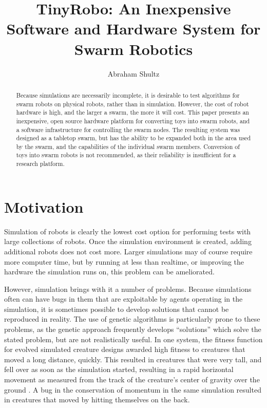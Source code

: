 \documentclass[]{article}
\title{TinyRobo: An Inexpensive Software and Hardware System for Swarm Robotics}
\author{Abraham Shultz}
\begin{document}
\maketitle

\begin{abstract}
Because simulations are necessarily incomplete, it is desirable to test algorithms for swarm robots on physical robots, rather than in simulation. 
However, the cost of robot hardware is high, and the larger a swarm, the more it will cost. 
This paper presents an inexpensive, open source hardware platform for converting toys into swarm robots, and a software infrastructure for controlling the swarm nodes. 
The resulting system was designed as a tabletop swarm, but has the ability to be expanded both in the area used by the swarm, and the capabilities of the individual swarm members. 
Conversion of toys into swarm robots is not recommended, as their reliability is insufficient for a research platform.

\end{abstract}

\section{Motivation}

Simulation of robots is clearly the lowest cost option for performing tests with large collections of robots. 
Once the simulation environment is created, adding additional robots does not cost more. 
Larger simulations may of course require more computer time, but by running at less than realtime, or improving the hardware the simulation runs on, this problem can be ameliorated. 

However, simulation brings with it a number of problems. 
Because simulations often can have bugs in them that are exploitable by agents operating in the simulation, it is sometimes possible to develop solutions that cannot be reproduced in reality. 
The use of genetic algorithms is particularly prone to these problems, as the genetic approach frequently develops ``solutions'' which solve the stated problem, but are not realistically useful. 
In one system, the fitness function for evolved simulated creature designs awarded high fitness to creatures that moved a long distance, quickly. 
This resulted in creatures that were very tall, and fell over as soon as the simulation started, resulting in a rapid horizontal movement as measured from the track of the creature's center of gravity over the ground \cite{brooks2000artificial, sims1994evolving}. 
A bug in the conservation of momentum in the same simulation resulted in creatures that moved by hitting themselves on the back. 
\end{document}
